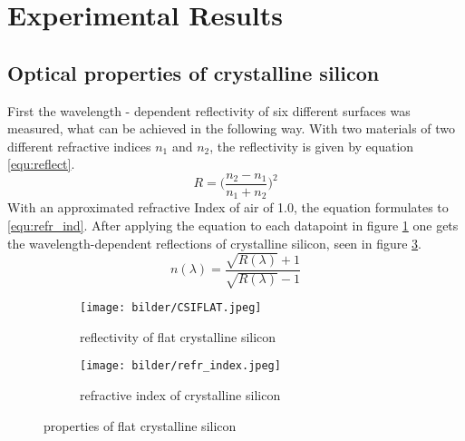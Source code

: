 \section{Experimental Results}
\subsection{Optical properties of crystalline silicon}
First the wavelength - dependent reflectivity of six different surfaces was measured, what can be achieved in the following way.\newline
With two materials of two different refractive indices $n_1$ and $n_2$,
the reflectivity is given by equation \ref{equ:reflect}.
\begin{equation}
  R = \bigg(\frac{n_2 - n_1}{n_1 + n_2}\bigg)^2
  \label{equ:reflect}
\end{equation}
With an approximated refractive Index of air of 1.0,
the equation formulates to \ref{equ:refr_ind}. After applying the equation to each datapoint in figure \ref{fig:csiflat} one gets the wavelength-dependent reflections of crystalline silicon, seen in figure \ref{fig:refr_index}. 
\begin{equation}
  n(\lambda) = \frac{\sqrt{R(\lambda)} + 1 }{ \sqrt{R(\lambda)} - 1}
  \label{equ:refr_ind}
\end{equation}
\begin{figure}[h]
  \centering
  \begin{subfigure}[b]{0.45\textwidth}
    \texttt{[image: bilder/CSIFLAT.jpeg]}
    \caption{reflectivity of flat crystalline silicon} 
    \label{fig:csiflat}
  \end{subfigure}
  \begin{subfigure}[b]{0.45\textwidth}
    \texttt{[image: bilder/refr\_index.jpeg]}
    \caption{refractive index of crystalline silicon}
    \label{fig:refr_index}
  \end{subfigure}
  \caption{properties of flat crystalline silicon}
\end{figure}

